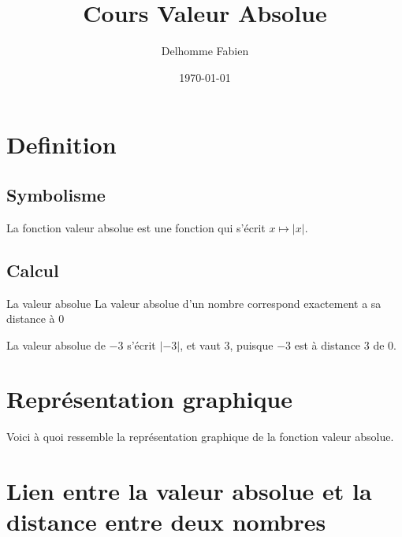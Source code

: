 \documentclass[11pt]{article}
\author{Delhomme Fabien}
\date{\today}
\title{Cours Valeur Absolue}
\begin{document}
\maketitle

\section{Definition}
\label{sec:org9ca7431}

\subsection{Symbolisme}
\label{sec:org5411d87}
La fonction valeur absolue est une fonction qui s'écrit \(x \mapsto |x|\).

\subsection{Calcul}
\label{sec:org94f6bab}
\begin{defi}{La valeur absolue}
La valeur absolue d'un nombre correspond exactement a sa distance à $0$
\end{defi}

\begin{ex}
La valeur absolue de $-3$ s'écrit $|-3|$, et vaut $3$, puisque $-3$ est à distance $3$ de $0$.
\end{ex}

\section{Représentation graphique}
\label{sec:org0b26480}

Voici à quoi ressemble la représentation graphique de la fonction valeur absolue.
\begin{center}
\end{center}

\section{Lien entre la valeur absolue et la distance entre deux nombres}
\label{sec:org0806dd6}
\end{document}
